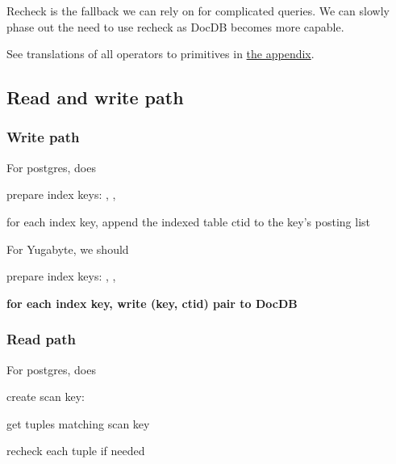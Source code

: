 \documentclass[11pt]{article}
\begin{document}
Recheck is the fallback we can rely on for complicated queries. We can slowly
phase out the need to use recheck as DocDB becomes more capable.

See translations of all operators to primitives in
\protect\hyperlink{operators-to-primitives}{the appendix}.

\hypertarget{read-and-write-path}{%
\subsection{Read and write path}\label{read-and-write-path}}

\hypertarget{write-path}{%
\subsubsection{Write path}\label{write-path}}

For postgres,  does

\begin{nparts}
\item
  prepare index keys: , , 
\item
  for each index key, append the indexed table ctid to the key's posting list
\end{nparts}

For Yugabyte, we should

\begin{nparts}
\item
  prepare index keys: , , 
\item
  \textbf{for each index key, write (key, ctid) pair to DocDB}
\end{nparts}

\hypertarget{read-path}{%
\subsubsection{Read path}\label{read-path}}

For postgres,  does

\begin{nparts}
\item
  create scan key: 
\item
  get tuples matching scan key
\item
  recheck each tuple if needed
\end{nparts}
\end{document}

